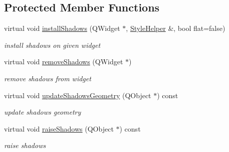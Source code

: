 \subsection*{Protected Member Functions}
\begin{DoxyCompactItemize}
\item 
\mbox{\label{class_frame_shadow_factory_a699f35d3eba723140398e56eb13b00a7}} 
virtual void \hyperlink{class_frame_shadow_factory_a699f35d3eba723140398e56eb13b00a7}{install\+Shadows} (Q\+Widget $\ast$, \hyperlink{class_style_helper}{Style\+Helper} \&, bool flat=false)
\begin{DoxyCompactList}\small\item\em install shadows on given widget \end{DoxyCompactList}\item 
\mbox{\label{class_frame_shadow_factory_a52b9f720eb7217a1ab32c91b08c59151}} 
virtual void \hyperlink{class_frame_shadow_factory_a52b9f720eb7217a1ab32c91b08c59151}{remove\+Shadows} (Q\+Widget $\ast$)
\begin{DoxyCompactList}\small\item\em remove shadows from widget \end{DoxyCompactList}\item 
\mbox{\label{class_frame_shadow_factory_a99be2ebfab2e5971ad0e8e6f850bc19a}} 
virtual void \hyperlink{class_frame_shadow_factory_a99be2ebfab2e5971ad0e8e6f850bc19a}{update\+Shadows\+Geometry} (Q\+Object $\ast$) const
\begin{DoxyCompactList}\small\item\em update shadows geometry \end{DoxyCompactList}\item 
\mbox{\label{class_frame_shadow_factory_ac07d48ff8378024657b25901aa0e38e8}} 
virtual void \hyperlink{class_frame_shadow_factory_ac07d48ff8378024657b25901aa0e38e8}{raise\+Shadows} (Q\+Object $\ast$) const
\begin{DoxyCompactList}\small\item\em raise shadows \end{DoxyCompactList}\item 
\mbox{\label{class_frame_shadow_factory_a50b91e17df9a7b482f874363049a7da8}} 

\end{DoxyCompactItemize}
